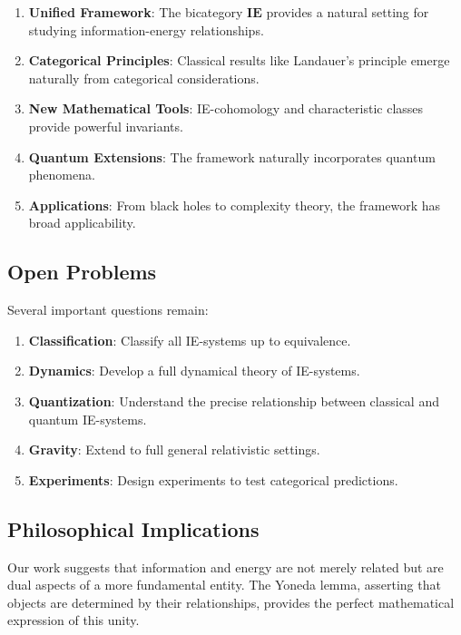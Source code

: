 \documentclass[12pt]{article}
\begin{document}
\begin{enumerate}
\item \textbf{Unified Framework}: The bicategory $\mathbf{IE}$ provides a natural setting for studying information-energy relationships.

\item \textbf{Categorical Principles}: Classical results like Landauer's principle emerge naturally from categorical considerations.

\item \textbf{New Mathematical Tools}: IE-cohomology and characteristic classes provide powerful invariants.

\item \textbf{Quantum Extensions}: The framework naturally incorporates quantum phenomena.

\item \textbf{Applications}: From black holes to complexity theory, the framework has broad applicability.
\end{enumerate}

\subsection{Open Problems}

Several important questions remain:

\begin{enumerate}
\item \textbf{Classification}: Classify all IE-systems up to equivalence.

\item \textbf{Dynamics}: Develop a full dynamical theory of IE-systems.

\item \textbf{Quantization}: Understand the precise relationship between classical and quantum IE-systems.

\item \textbf{Gravity}: Extend to full general relativistic settings.

\item \textbf{Experiments}: Design experiments to test categorical predictions.
\end{enumerate}

\subsection{Philosophical Implications}

Our work suggests that information and energy are not merely related but are dual aspects of a more fundamental entity. The Yoneda lemma, asserting that objects are determined by their relationships, provides the perfect mathematical expression of this unity.
\end{document}
